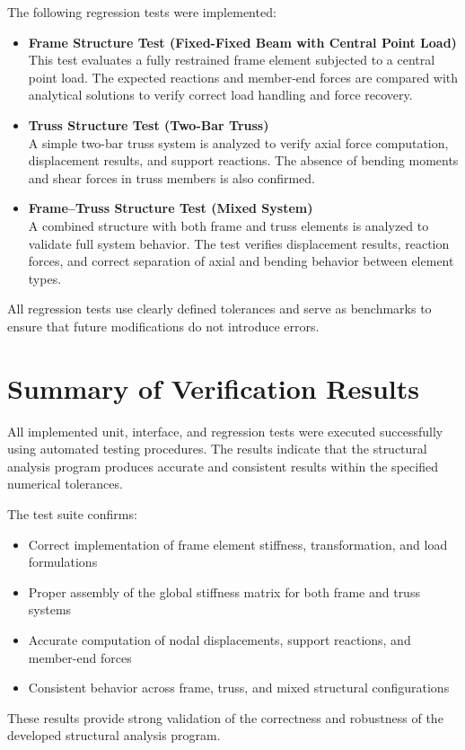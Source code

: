 The following regression tests were implemented:
\begin{itemize}
    \item \textbf{Frame Structure Test (Fixed-Fixed Beam with Central Point Load)} \\
    This test evaluates a fully restrained frame element subjected to a central point load. The expected reactions and member-end forces are compared with analytical solutions to verify correct load handling and force recovery.
    \item \textbf{Truss Structure Test (Two-Bar Truss)} \\
    A simple two-bar truss system is analyzed to verify axial force computation, displacement results, and support reactions. The absence of bending moments and shear forces in truss members is also confirmed.
    \item \textbf{Frame--Truss Structure Test (Mixed System)} \\
    A combined structure with both frame and truss elements is analyzed to validate full system behavior. The test verifies displacement results, reaction forces, and correct separation of axial and bending behavior between element types.
\end{itemize}

All regression tests use clearly defined tolerances and serve as benchmarks to ensure that future modifications do not introduce errors.

\section{Summary of Verification Results}

All implemented unit, interface, and regression tests were executed successfully using automated testing procedures. The results indicate that the structural analysis program produces accurate and consistent results within the specified numerical tolerances.

The test suite confirms:
\begin{itemize}
    \item Correct implementation of frame element stiffness, transformation, and load formulations
    \item Proper assembly of the global stiffness matrix for both frame and truss systems
    \item Accurate computation of nodal displacements, support reactions, and member-end forces
    \item Consistent behavior across frame, truss, and mixed structural configurations
\end{itemize}

These results provide strong validation of the correctness and robustness of the developed structural analysis program.

